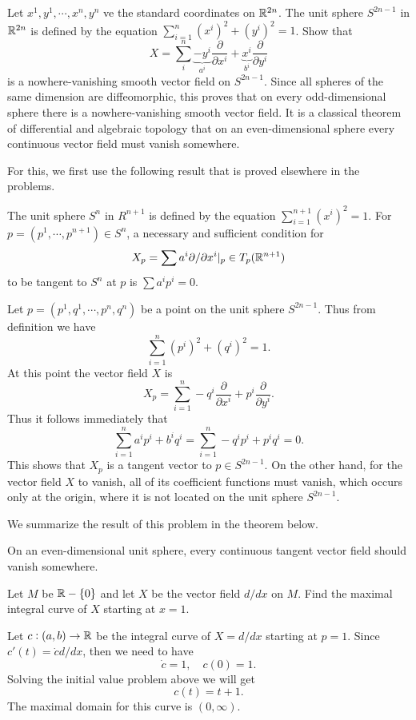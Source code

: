 \begin{problem}
	Let $ x^1,y^1,\cdots,x^n,y^n $ ve the standard coordinates on $ \mathbb{R}^{2n} $. The unit sphere $ S^{2n-1} $ in $ \mathbb{R}^{2n} $ is defined by the equation $ \sum_{i=1}^n (x^i)^2 + (y^i)^2  = 1$. Show that 
	\[ X = \sum_{i}^{n} \underbrace{-y^i}_{a^i} \frac{\partial}{\partial  x^i} + \underbrace{x^i}_{b^i} \frac{\partial }{\partial y^i} \]
	is a nowhere-vanishing smooth vector field on $ S^{2n-1} $. Since all spheres of the same dimension are diffeomorphic, this proves that on every odd-dimensional sphere there is a nowhere-vanishing smooth vector field. It is a classical theorem of differential and algebraic topology that on an even-dimensional sphere every continuous vector field must vanish somewhere.
\end{problem}

\begin{solution}
	For this, we first use the following result that is proved elsewhere in the problems.
	\begin{lemma}
		The unit sphere $ S^n $ in $ R^{n+1} $ is defined by the equation $ \sum_{i=1}^{n+1} (x^i)^2 = 1 $. For $ p = (p^1,\cdots,p^{n+1}) \in S^n $, a necessary and sufficient condition for 
		\[ X_p = \sum a^i \partial/\partial x^i|_{p} \in T_p(\mathbb{R}^{n+1})  \]
		to be tangent to $ S^n $ at $ p $ is $ \sum a^i p^i = 0 $.
	\end{lemma}
	Let $ p = (p^1,q^1,\cdots,p^n,q^n) $ be a point on the unit sphere $ S^{2n-1} $. Thus from definition we have
	\[ \sum_{i=1}^{n} (p^i)^2 + (q^i)^2 = 1. \]
	At this point the vector field $ X $ is
	\[ X_p = \sum_{i=1}^{n} - q^i \frac{\partial}{\partial x^i} + p^i \frac{\partial}{\partial y^i}. \]
	Thus it follows immediately that 
	\[ \sum_{i=1}^{n} a^i p^i + b^i q^i = \sum_{i=1}^{n} -q^i p^i + p^i q^i = 0.  \]
	This shows that $ X_p $ is a tangent vector to $ p \in S^{2n-1} $. On the other hand, for the vector field $ X $ to vanish, all of its coefficient functions must vanish, which occurs only at the origin, where it is not located on the unit sphere $ S^{2n-1} $.
	
	We summarize the result of this problem in the theorem below.
	\begin{theorem}
		On an even-dimensional unit sphere, every continuous tangent vector field should vanish somewhere.
	\end{theorem}
\end{solution}

\begin{problem}
	Let $ M $ be $ \mathbb{R} - \{0\} $ and let $ X $ be the vector field $ d/dx $ on $ M $. Find the maximal integral curve of $ X $ starting at $ x = 1 $.
\end{problem}
\begin{solution}
	Let $ c:(a,b) \to \mathbb{R} $ be the integral curve of $ X = d/dx $ starting at $ p = 1 $. Since $ c'(t) = \dot{c}d/dx $, then we need to have
	\[ \dot{c} = 1,\quad c(0) = 1. \]
	Solving the initial value problem above we will get
	\[ c(t) = t + 1. \]
	The maximal domain for this curve is $ (0,\infty) $.
\end{solution}


